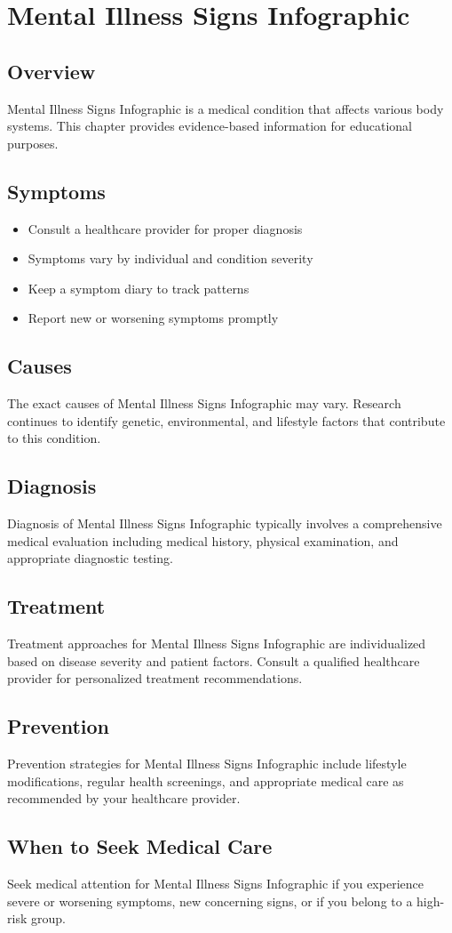 \chapter{Mental Illness Signs Infographic}

\section*{Overview}
Mental Illness Signs Infographic is a medical condition that affects various body systems. This chapter provides evidence-based information for educational purposes.

\section*{Symptoms}
\begin{itemize}
  \item Consult a healthcare provider for proper diagnosis
  \item Symptoms vary by individual and condition severity
  \item Keep a symptom diary to track patterns
  \item Report new or worsening symptoms promptly
\end{itemize}

\section*{Causes}
The exact causes of Mental Illness Signs Infographic may vary. Research continues to identify genetic, environmental, and lifestyle factors that contribute to this condition.

\section*{Diagnosis}
Diagnosis of Mental Illness Signs Infographic typically involves a comprehensive medical evaluation including medical history, physical examination, and appropriate diagnostic testing.

\section*{Treatment}
Treatment approaches for Mental Illness Signs Infographic are individualized based on disease severity and patient factors. Consult a qualified healthcare provider for personalized treatment recommendations.

\section*{Prevention}
Prevention strategies for Mental Illness Signs Infographic include lifestyle modifications, regular health screenings, and appropriate medical care as recommended by your healthcare provider.

\section*{When to Seek Medical Care}
Seek medical attention for Mental Illness Signs Infographic if you experience severe or worsening symptoms, new concerning signs, or if you belong to a high-risk group.
\clearpage
